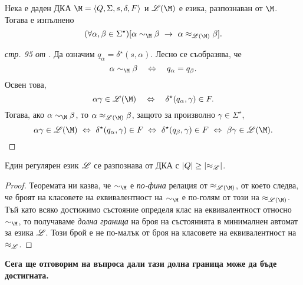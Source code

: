 \begin{thm}
  \label{th:rel-finer}
  Нека е даден ДКА $\M = \FA$ и $\Ls(\M)$ е езика, разпознаван от $\M$. Тогава е изпълнено
  \[(\forall \alpha,\beta \in \Sigma^\star)[\alpha\sim_\M\beta\ \rightarrow\ \alpha\approx_{\Ls(\M)}\beta].\]
\end{thm}
\begin{proof}[стр. 95 от \cite{papadimitriou}]
  Да означим $q_\alpha = \delta^\star(s, \alpha)$.
  Лесно се съобразява, че 
  \[\alpha \sim_\M \beta\quad\Leftrightarrow\quad q_\alpha = q_\beta.\]
  Освен това, 
  \[\alpha\gamma \in \Ls(\M)\quad \Leftrightarrow\quad \delta^\star(q_\alpha, \gamma) \in F.\]
  Тогава, ако $\alpha \sim_\M \beta$, то  $\alpha \approx_{\Ls(\M)}\beta$, защото за произволно $\gamma \in \Sigma^\star$,
  \[\alpha\gamma \in \Ls(\M)\ \Leftrightarrow\ \delta^\star(q_\alpha,\gamma) \in F\ \Leftrightarrow\ \delta^\star(q_\beta, \gamma)\in F\ \Leftrightarrow\ \beta\gamma \in \Ls(\M).\]  
\end{proof}

\begin{cor}
  Един регулярен език $\mathscr{L}$ се разпознава от ДКА с $\vert{Q}\vert \geq \vert{\approx_{\mathscr{L}}}\vert$.
\end{cor}
\begin{proof}
  Теоремата ни казва, че $\sim_\M$ е {\em по-фина} релация от $\approx_{\Ls(\M)}$, от което следва, че
  броят на класовете на еквивалентност на $\sim_\M$ е по-голям от този на $\approx_{\Ls(\M)}$.
  Тъй като всяко достижимо състояние определя клас на еквивалентност относно $\sim_\M$,
  то получаваме {\em долна граница} на броя на състоянията в минималнен автомат за езика $\mathscr{L}$.
  Този брой е не по-малък от броя на класовете на еквивалентност на $\approx_{\mathscr{L}}$.
  
\end{proof}

{\bf Сега ще отговорим на въпроса дали тази долна граница може да бъде достигната.}

